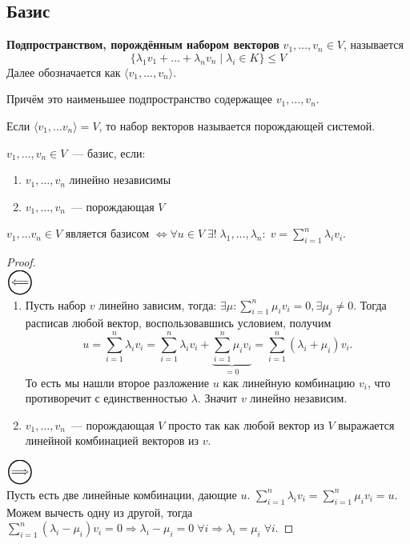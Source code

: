 \subsection{Базис}
\begin{definition}
    \textbf{Подпространством, порождённым набором векторов} $v_1, \dots, v_n\in V$, называется
    $$\{\lambda_1v_1 + \dots + \lambda_nv_n \mid \lambda_i\in K\}\le V$$
    Далее обозначается как $\langle v_1,\dots, v_n\rangle$.\\
\end{definition}
\begin{remark}
    Причём это наименьшее подпространство содержащее $v_1,\dots,v_n$.
\end{remark}
\begin{definition}
    Если $\langle v_1,\dots v_n\rangle = V$, то набор векторов называется
    порождающей системой.
\end{definition}
\begin{definition}
    $v_1, \dots, v_n\in V$~--- базис, если:
    \begin{enumerate}
        \item $v_1,\dots,v_n$ линейно независимы
        \item $v_1,\dots, v_n$~--- порождающая $V$
    \end{enumerate}
\end{definition}
\begin{lemma}
    $v_1,\dots v_n \in V$ является базисом $\Leftrightarrow \forall u\in V \; \exists !\;
    \lambda_1,\dots,\lambda_n\colon\; v = \sum\limits_{i=1}^{n}\lambda_iv_i$.
\end{lemma}
\begin{proof} \leavevmode\\
    $\ola$
    \begin{enumerate}
        \item Пусть набор $v$ линейно зависим, тогда: $\exists \mu \colon \sum\limits_{i=1}^{n}\mu_iv_i=0, \exists \mu_j\not=0$.
            Тогда расписав любой вектор, воспользовавшись условием, получим 
            \[
                u = \sum\limits_{i=1}^{n}\lambda_iv_i =
                \sum\limits_{i=1}^{n}\lambda_iv_i + \underbrace{\sum_{i=1}^{n}{\mu_iv_i}}_{=0} =
                \sum\limits_{i=1}^{n}(\lambda_i+\mu_i)v_i
            .\]
            То есть мы нашли второе разложение $u$ как линейную комбинацию $v_i$,
            что противоречит с единственностью $\lambda$. Значит $v$ линейно независим.
        \item $v_1,\dots, v_n$~--- порождающая $V$ просто так как любой вектор из $V$ выражается
            линейной комбинацией векторов из $v$.
    \end{enumerate}
    $\ora$

    Пусть есть две линейные комбинации, дающие $u$.
    $\sum\limits_{i=1}^{n} \lambda_iv_i = \sum\limits_{i=1}^{n} \mu_iv_i = u$. Можем вычесть одну из другой, тогда
    $\sum\limits_{i=1}^{n}(\lambda_i - \mu_i)v_i = 0\Rightarrow \lambda_i-\mu_i=0\;\forall i
    \Rightarrow \lambda_i = \mu_i\;\forall i$.
\end{proof}

